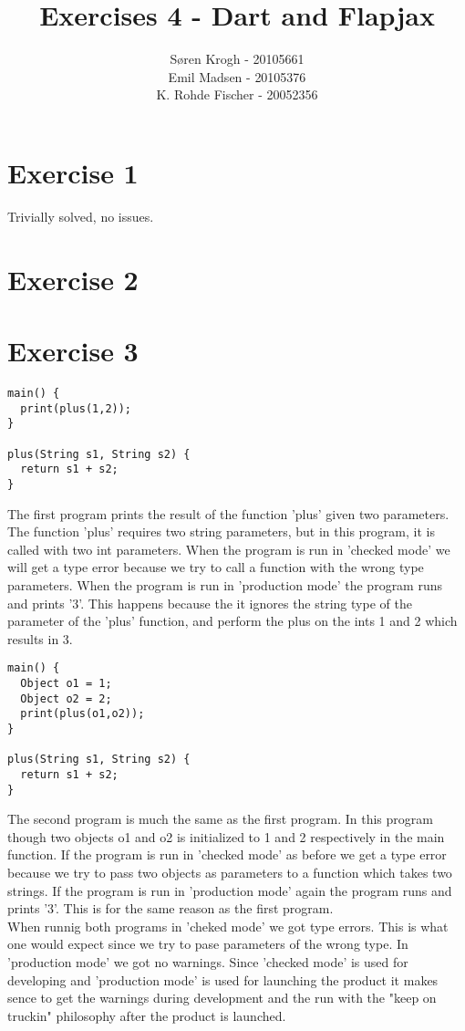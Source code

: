 \documentclass[a4paper,10pt]{article}
\author{
Søren Krogh -  20105661 \\
Emil Madsen - 20105376  \\
K. Rohde Fischer - 20052356\\}
\title{Exercises 4 - Dart and Flapjax}
\begin{document}
\maketitle

\section*{Exercise 1}
Trivially solved, no issues.

\section*{Exercise 2}


\section*{Exercise 3}
\begin{verbatim}
main() {
  print(plus(1,2));
}

plus(String s1, String s2) {
  return s1 + s2;
}
\end{verbatim}
The first program prints the result of the function 'plus' given two parameters. The function 'plus' requires two string parameters, but in this program, it is called with two int parameters. When the program is run in 'checked mode' we will get a type error because we try to call a function with the wrong type parameters. When the program is run in 'production mode' the program runs and prints '3'. This happens because the it ignores the string type of the parameter of the 'plus' function, and perform the plus on the ints 1 and 2 which results in 3.

\begin{verbatim}
main() {
  Object o1 = 1;
  Object o2 = 2;
  print(plus(o1,o2));
}

plus(String s1, String s2) {
  return s1 + s2;
}
\end{verbatim}
The second program is much the same as the first program. In this program though two objects o1 and o2 is initialized to 1 and 2 respectively in the main function. If the program is run in 'checked mode' as before we get a type error because we try to pass two objects as parameters to a function which takes two strings. If the program is run in 'production mode' again the program runs and prints '3'. This is for the same reason as the first program.\\

When runnig both programs in 'cheked mode' we got type errors. This is what one would expect since we try to pase parameters of the wrong type. In 'production mode' we got no warnings. Since 'checked mode' is used for developing and 'production mode' is used for launching the product it makes sence to get the warnings during development and the run with the "keep on truckin" philosophy after the product is launched.\\
\end{document}
